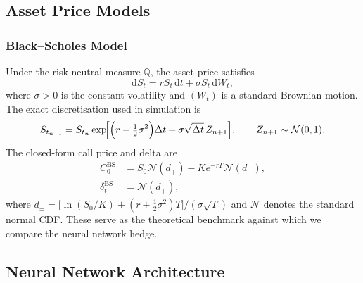
\subsection{Asset Price Models}
\label{subsec:models}

\subsubsection{Black--Scholes Model}
\label{subsubsec:bs}

Under the risk-neutral measure $\mathbb{Q}$, the asset price satisfies
\begin{equation}
    \mathrm{d}S_t = r S_t \,\mathrm{d}t + \sigma S_t \,\mathrm{d}W_t,
    \label{eq:bs_sde}
\end{equation}
where $\sigma > 0$ is the constant volatility and $(W_t)$ is a standard Brownian
motion. The exact discretisation used in simulation is
\[
    S_{t_{n+1}} = S_{t_n} \exp\!\Bigl[\Bigl(r - \tfrac{1}{2}\sigma^2\Bigr)\Delta t
        + \sigma\sqrt{\Delta t}\,Z_{n+1}\Bigr], \qquad Z_{n+1}\sim\mathcal{N}(0,1).
\]
The closed-form call price and delta are
\begin{align}
    C_0^{\mathrm{BS}} &= S_0 \mathcal{N}(d_+) - K e^{-rT}\mathcal{N}(d_-),
    \label{eq:bs_price}\\
    \delta_t^{\mathrm{BS}} &= \mathcal{N}(d_+),
    \label{eq:bs_delta}
\end{align}
where $d_{\pm} = \bigl[\ln(S_0/K) + (r \pm \tfrac{1}{2}\sigma^2)T\bigr]/(\sigma\sqrt{T})$
and $\mathcal{N}$ denotes the standard normal CDF. These serve as the theoretical
benchmark against which we compare the neural network hedge.


\subsection{Neural Network Architecture}
\label{subsec:architecture}


